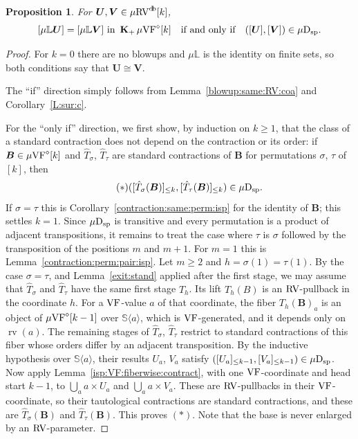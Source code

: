 \documentclass[12pt]{amsart}
\theoremstyle{plain}
\newtheorem{prop}[thm]{Proposition}
\theoremstyle{definition}
\theoremstyle{remark}
\numberwithin{equation}{section}
\theoremstyle{plain}
\newcommand{\VF}{\textup{VF}}
\newcommand{\RV}{\textup{RV}}
\newcommand{\0}{\emptyset}
\newcommand{\bb}[1]{\mathbb{#1}}
\newcommand{\la}{\langle}
\newcommand{\ra}{\rangle}
\newcommand{\mVF}{{\mu}{\VF}}
\newcommand{\mRV}{{\mu}{\RV}}
\newcommand{\dsp}{\textup{D}_{\textup{sp}}}
\newcommand{\mispdb}{\mu \dsp}
\newcommand{\mL}{{\mu}{\bb L}}
\DeclareMathOperator{\rv}{rv}
\DeclareMathOperator{\gsk}{\mathbf{K}_+}
\DeclareMathOperator{\db}{d \! b}
\begin{document}
\begin{prop}\label{kernel:L}
For $\bm U, \bm V \in \mRV^{\db}[k]$,
\[
[\mu\bb L \bm U] = [\mu\bb L \bm V] \text{ in }\gsk \mVF^\diamond[k] \quad \text{if and only if} \quad ([\bm U], [\bm V]) \in \mispdb.
\]
\end{prop}
\begin{proof}
For $k = 0$ there are no blowups and $\mL$ is the identity on finite sets, so both conditions say that $\bm U \cong \bm V$.

The ``if'' direction simply follows from Lemma~\ref{blowup:same:RV:coa} and Corollary~\ref{L:sur:c}.

For the ``only if'' direction, we first show, by induction on $k \geq 1$, that the class of a standard contraction does not depend on the contraction or its order: if $\bm B \in \mVF^\diamond[k]$ and $\hat T_\sigma$, $\hat T_\tau$ are standard contractions of $\bm B$ for permutations $\sigma$, $\tau$ of $[k]$, then
\begin{equation*}\tag{$\ast$}
([\hat T_\sigma(\bm B)]_{\leq k}, [\hat T_\tau(\bm B)]_{\leq k}) \in \mispdb.
\end{equation*}
If $\sigma = \tau$ this is Corollary~\ref{contraction:same:perm:isp} for the identity of $\bm B$; this settles $k = 1$. Since $\mispdb$ is transitive and every permutation is a product of adjacent transpositions, it remains to treat the case where $\tau$ is $\sigma$ followed by the transposition of the positions $m$ and $m+1$. For $m = 1$ this is Lemma~\ref{contraction:perm:pair:isp}. Let $m \geq 2$ and $h = \sigma(1) = \tau(1)$. By the case $\sigma = \tau$, and Lemma~\ref{exit:stand} applied after the first stage, we may assume that $\hat T_\sigma$ and $\hat T_\tau$ have the same first stage $T_h$. Its lift $T_h(B)$ is an $\RV$-pullback in the coordinate $h$. For a $\VF$-value $a$ of that coordinate, the fiber $T_h(\bm B)_a$ is an object of $\mVF^\diamond[k-1]$ over $\mathbb S \la a \ra$, which is $\VF$-generated, and it depends only on $\rv(a)$. The remaining stages of $\hat T_\sigma$, $\hat T_\tau$ restrict to standard contractions of this fiber whose orders differ by an adjacent transposition. By the inductive hypothesis over $\mathbb S \la a \ra$, their results $U_a$, $V_a$ satisfy $([U_a]_{\leq k-1}, [V_a]_{\leq k-1}) \in \mispdb$. Now apply Lemma~\ref{isp:VF:fiberwise:contract}, with one $\VF$-coordinate and head start $k-1$, to $\bigcup_a a \times U_a$ and $\bigcup_a a \times V_a$. These are $\RV$-pullbacks in their $\VF$-coordinate, so their tautological contractions are standard contractions, and these are $\hat T_\sigma(\bm B)$ and $\hat T_\tau(\bm B)$. This proves $(\ast)$. Note that the base is never enlarged by an $\RV$-parameter.


\end{proof}
\end{document}
